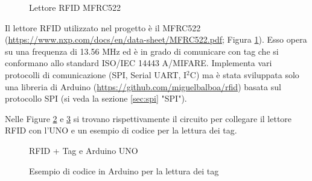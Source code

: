 \documentclass[12pt]{report}
\begin{document}
\begin{figure}
	\caption{Lettore RFID MFRC522}
	\label{fig:mfrc522}
\end{figure}

Il lettore RFID utilizzato nel progetto è il MFRC522 (\url{https://www.nxp.com/docs/en/data-sheet/MFRC522.pdf}; Figura \ref{fig:mfrc522}). Esso opera su una frequenza di 13.56 MHz ed è in grado di comunicare con tag che si conformano allo standard ISO/IEC 14443 A/MIFARE. Implementa vari protocolli di comunicazione (SPI, Serial UART, I$^2$C) ma è stata sviluppata solo una libreria di Arduino (\url{https://github.com/miguelbalboa/rfid}) basata sul protocollo SPI (si veda la sezione \ref{sec:spi} "SPI").

Nelle Figure \ref{fig:rfid_uno} e \ref{fig:rfid_code} si trovano rispettivamente il circuito per collegare il lettore RFID con l'UNO e un esempio di codice per la lettura dei tag.

\begin{figure}
	\caption{RFID + Tag e Arduino UNO}
	\label{fig:rfid_uno}
\end{figure}

\begin{figure}
	\caption{Esempio di codice in Arduino per la lettura dei tag}
	\label{fig:rfid_code}
\end{figure}
\end{document}
